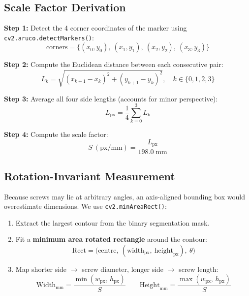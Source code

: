 \documentclass[12pt, a4paper, twoside]{report}
\begin{document}
\subsection{Scale Factor Derivation}

\textbf{Step 1:} Detect the 4 corner coordinates of the marker using \texttt{cv2.aruco.detectMarkers()}:
\begin{equation}
\text{corners} = \{(x_0, y_0),\ (x_1, y_1),\ (x_2, y_2),\ (x_3, y_3)\}
\end{equation}

\textbf{Step 2:} Compute the Euclidean distance between each consecutive pair:
\begin{equation}
L_k = \sqrt{(x_{k+1} - x_k)^2 + (y_{k+1} - y_k)^2}, \quad k \in \{0, 1, 2, 3\}
\end{equation}

\textbf{Step 3:} Average all four side lengths (accounts for minor perspective):
\begin{equation}
L_{\text{px}} = \frac{1}{4}\sum_{k=0}^{3} L_k
\end{equation}

\textbf{Step 4:} Compute the scale factor:
\begin{equation}
\boxed{S\ (\text{px/mm}) = \frac{L_{\text{px}}}{198.0\;\text{mm}}}
\label{eq:scale-factor}
\end{equation}

\subsection{Rotation-Invariant Measurement}
Because screws may lie at arbitrary angles, an axis-aligned bounding box would overestimate dimensions. We use \texttt{cv2.minAreaRect()}:

\begin{enumerate}
    \item Extract the largest contour from the binary segmentation mask.
    \item Fit a \textbf{minimum area rotated rectangle} around the contour:
    \begin{equation}
    \text{Rect} = \big(\text{centre},\ (\text{width}_{\text{px}},\ \text{height}_{\text{px}}),\ \theta\big)
    \end{equation}
    \item Map shorter side $\rightarrow$ screw diameter, longer side $\rightarrow$ screw length:
    \begin{equation}
    \boxed{\text{Width}_{\text{mm}} = \frac{\min(w_{\text{px}},\, h_{\text{px}})}{S}} \qquad
    \boxed{\text{Height}_{\text{mm}} = \frac{\max(w_{\text{px}},\, h_{\text{px}})}{S}}
    \label{eq:final-measurement}
    \end{equation}
\end{enumerate}
\end{document}
